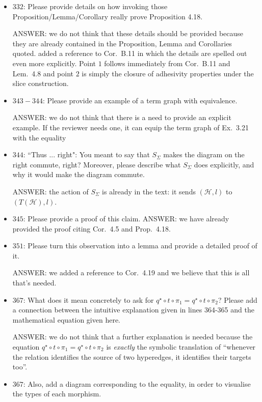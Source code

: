 \documentclass[english,11pt,a4paper]{article}
\begin{document}
\begin{itemize}
\item $332$: Please provide details on how invoking those Proposition/Lemma/Corollary really prove Proposition 4.18.

ANSWER: we do not think that these details should be provided because they are already contained in the  Proposition, Lemma and Corollaries quoted.  added a reference to Cor.~B.11 in which the details are spelled out even more explicitly.  Point $1$ follows immediately from Cor.~B.11 and Lem.~4.8 and point $2$ is simply the closure of adhesivity properties under the slice construction.


\item$343-344$: Please provide an example of a term graph with equivalence.

ANSWER: we do not think that there is a need to provide an explicit example. If the reviewer needs one, it can equip the term graph of Ex.~3.21 with the equality

\item $344$: ``Thus ... right": You meant to say that $S_\Sigma$ makes the diagram on the right commute, right? Moreover, please describe what $S_\Sigma$ does explicitly, and why it would make the diagram commute.

ANSWER: the action of $S_\Sigma$ is already in the text: it sends $(\mathcal{H},l)$ to $(T(\mathcal{H}),l)$. 

\item $345$: Please provide a proof of this claim.
ANSWER: we have already provided the proof citing Cor.~4.5 and Prop.~4.18.

\item $351$: Please turn this observation into a lemma and provide a detailed proof of it.

ANSWER: we added a reference to Cor.~4.19  and we believe that this is all that's needed. 


\item $367$: What does it mean concretely to ask for $q^\star \circ t\circ \pi_1= q^\star \circ t \circ \pi_2$? Please add a connection between the intuitive explanation given in lines 364-365 and the mathematical equation given here. 

ANSWER: we do not think that a further explanation is needed because the equation $q^\star \circ t\circ \pi_1= q^\star \circ t \circ \pi_2$ is \emph{exactly} the symbolic translation of ``whenever the relation identifies the source of two hyperedges, it identifies their targets too''.

\item $367$: Also, add a diagram corresponding to the equality, in order to visualise the types of each morphism.


\end{itemize}
\end{document}
